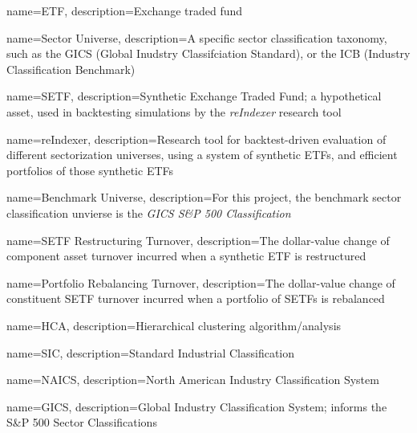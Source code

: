 \makeglossaries



{
    name=ETF,
    description={Exchange traded fund}
}


{
    name=Sector Universe,
    description={A specific sector classification taxonomy, such as the GICS (Global Inudstry Classifciation Standard), or the ICB (Industry Classification Benchmark)}
}

{
    name=SETF,
    description={Synthetic Exchange Traded Fund; a hypothetical asset, used in backtesting simulations by the \textit{reIndexer} research tool}
}

{
    name=reIndexer,
    description={Research tool for backtest-driven evaluation of different sectorization universes, using a system of synthetic ETFs, and efficient portfolios of those synthetic ETFs}
}

{
    name=Benchmark Universe,
    description={For this project, the benchmark sector classification unvierse is the \textit{GICS S\&P 500 Classification}}
}

{
    name=SETF Restructuring Turnover,
    description={The dollar-value change of component asset turnover incurred when a synthetic ETF is restructured}
}

{
    name=Portfolio Rebalancing Turnover,
    description={The dollar-value change of constituent SETF turnover incurred when a portfolio of SETFs is rebalanced}
}

{
    name=HCA,
    description={Hierarchical clustering algorithm/analysis}
}

{
    name=SIC,
    description={Standard Industrial Classification}
}

{
    name=NAICS,
    description={North American Industry Classification System}
}

{
    name=GICS,
    description={Global Industry Classification System; informs the S\&P 500 Sector Classifications}
}